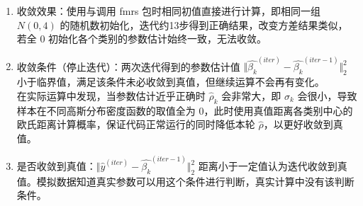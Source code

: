\documentclass[12pt, a4paper, oneside]{article}
\numberwithin{equation}{section}
\begin{document}
\begin{enumerate}
	\item 收敛效果：使用与调用 fmrs 包时相同初值直接进行计算，即相同一组 $N(0, 4)$ 的随机数初始化，迭代约13步得到正确结果，改变方差结果类似，若全 0 初始化各个类别的参数估计始终一致，无法收敛。
	\item 收敛条件（停止迭代）：两次迭代得到的参数估计值 $\Vert\hat{\beta_k}^{(iter)}-\hat{\beta_k}^{(iter-1)}\Vert_2^2$ 小于临界值，满足该条件未必收敛到真值，但继续运算不会再有变化。\\在实际运算中发现，当参数估计近乎正确时 $\hat{\rho}_k$ 会非常大，即 $\sigma_k$ 会很小，导致样本在不同高斯分布密度函数的取值全为 0，此时使用真值距离各类别中心的欧氏距离计算概率，保证代码正常运行的同时降低本轮 $\hat\rho$，以更好收敛到真值。
	\item 是否收敛到真值：$\Vert\hat{y}^{(iter)}-\hat{\beta_k}^{(iter-1)}\Vert_2^2$ 距离小于一定值认为迭代收敛到真值。模拟数据知道真实参数可以用这个条件进行判断，真实计算中没有该判断条件。
\end{enumerate}
\end{document}

